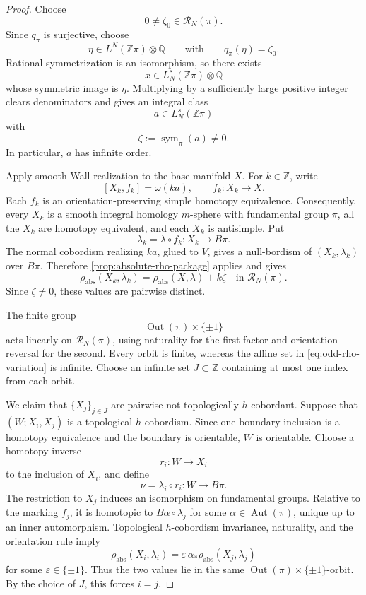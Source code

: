 \documentclass[10pt,reqno]{amsart}
\numberwithin{equation}{section}
\theoremstyle{definition}
\theoremstyle{remark}
\newcommand{\Z}{\mathbb Z}
\newcommand{\Q}{\mathbb Q}
\newcommand{\Aut}{\operatorname{Aut}}
\newcommand{\Out}{\operatorname{Out}}
\newcommand{\cR}{\mathcal R}
\newcommand{\rhoabs}{\rho_{\mathrm{abs}}}
\begin{document}
\begin{proof}
Choose
\[
0\neq\zeta_0\in\cR_N(\pi).
\]
Since \(q_\pi\) is surjective, choose
\[
\eta\in L^N(\Z\pi)\otimes\Q
\qquad\text{with}\qquad
q_\pi(\eta)=\zeta_0.
\]
Rational symmetrization is an isomorphism, so there exists
\[
x\in L_N^s(\Z\pi)\otimes\Q
\]
whose symmetric image is \(\eta\).  Multiplying by a sufficiently
large positive integer clears denominators and gives an integral
class
\[
a\in L_N^s(\Z\pi)
\]
with
\[
\zeta:=\operatorname{sym}_\pi(a)\neq0.
\]
In particular, \(a\) has infinite order.

Apply smooth Wall realization to the base manifold \(X\).  For
\(k\in\Z\), write
\[
[X_k,f_k]=\omega(ka),
\qquad
f_k\colon X_k\longrightarrow X.
\]
Each \(f_k\) is an orientation-preserving simple homotopy equivalence.
Consequently, every \(X_k\) is a smooth integral homology
\(m\)-sphere with fundamental group \(\pi\), all the \(X_k\) are
homotopy equivalent, and each \(X_k\) is antisimple.  Put
\[
\lambda_k=\lambda\circ f_k\colon X_k\longrightarrow B\pi.
\]
The normal cobordism realizing \(ka\), glued to \(V\), gives a
null-bordism of \((X_k,\lambda_k)\) over \(B\pi\).  Therefore
\cref{prop:absolute-rho-package} applies and gives
\begin{equation}\label{eq:odd-rho-variation}
\rhoabs(X_k,\lambda_k)
=
\rhoabs(X,\lambda)+k\zeta
\quad\text{in }\cR_N(\pi).
\end{equation}
Since \(\zeta\neq0\), these values are pairwise distinct.

The finite group
\[
\Out(\pi)\times\{\pm1\}
\]
acts linearly on \(\cR_N(\pi)\), using naturality for the first factor
and orientation reversal for the second.  Every orbit is finite,
whereas the affine set in \eqref{eq:odd-rho-variation} is infinite.
Choose an infinite set \(J\subset\Z\) containing at most one index
from each orbit.

We claim that \(\{X_j\}_{j\in J}\) are pairwise not topologically
\(h\)-cobordant.  Suppose that \((W;X_i,X_j)\) is a topological
\(h\)-cobordism.  Since one boundary inclusion is a homotopy
equivalence and the boundary is orientable, \(W\) is orientable.
Choose a homotopy inverse
\[
r_i\colon W\longrightarrow X_i
\]
to the inclusion of \(X_i\), and define
\[
\nu=\lambda_i\circ r_i\colon W\longrightarrow B\pi.
\]
The restriction to \(X_j\) induces an isomorphism on fundamental
groups.  Relative to the marking \(f_j\), it is homotopic to
\(B\alpha\circ\lambda_j\) for some \(\alpha\in\Aut(\pi)\), unique
up to an inner automorphism.  Topological \(h\)-cobordism invariance,
naturality, and the orientation rule imply
\[
\rhoabs(X_i,\lambda_i)
=
\varepsilon\,\alpha_*\rhoabs(X_j,\lambda_j)
\]
for some \(\varepsilon\in\{\pm1\}\).  Thus the two values lie in the
same \(\Out(\pi)\times\{\pm1\}\)-orbit.  By the choice of \(J\),
this forces \(i=j\).


\end{proof}
\end{document}
